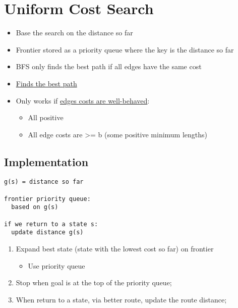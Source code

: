\section{Uniform Cost Search}

  \begin{itemize}
    \item Base the search on the distance so far
    \item Frontier stored as a priority queue where the key is the distance so far
    \item BFS only finds the best path if all edges have the same cost
    \item \ul{Finds the best path}
    \item Only works if \ul{edges costs are well-behaved}:
    \begin{itemize}
      \item All positive
      \item All edge costs are >= b (some positive minimum lengths)
    \end{itemize}
  \end{itemize}

  \subsection{Implementation}

    \begin{lstlisting}[style=pseudo]
g(s) = distance so far

frontier priority queue:
  based on g(s)

if we return to a state s:
  update distance g(s)
    \end{lstlisting}

    \begin{enumerate}
      \item Expand best state (state with the lowest cost so far) on frontier
      \begin{itemize}
        \item Use priority queue
      \end{itemize}

      \item Stop when goal is at the top of the priority queue;
      \item When return to a state, via better route, update the route distance;
    \end{enumerate}
